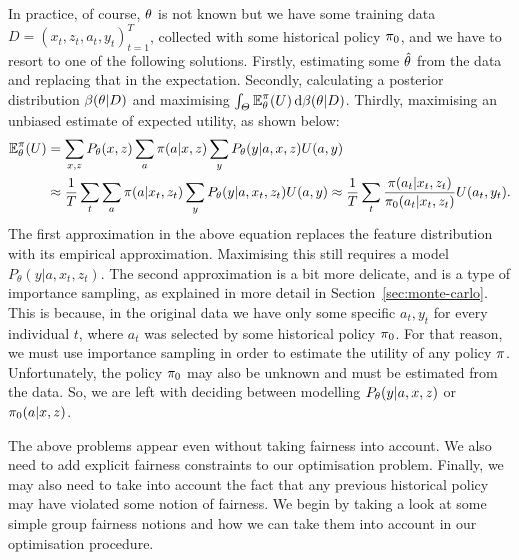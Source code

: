 \begin{frame}
{    
    In practice, of course, $\theta$ is not known but we have some training data $D = (x_t, z_t, a_t, y_t)_{t=1}^T$, collected with some historical policy $\pi_0$, and  we have to resort to one of the following solutions. Firstly, estimating some $\hat{\theta}$ from the data and replacing that in the expectation. Secondly, calculating a posterior distribution $\beta(\theta | D)$ and maximising $\int_\Theta \mathop{\mbox{\ensuremath{\mathbb{E}}}}\nolimits_\theta^\pi(U) \,\mathrm{d} \beta(\theta | D)$. Thirdly, maximising an unbiased estimate of expected utility, as shown below:
    \begin{align*}
      \mathop{\mbox{\ensuremath{\mathbb{E}}}}\nolimits^\pi_\theta(U)
      &=
        \sum_{x,z} P_\theta(x, z) \sum_a \pi(a | x, z) \sum_y P_\theta(y | a, x, z) U(a,y) \\
      &\approx
        \frac{1}{T} \sum_{t} \sum_a \pi(a | x_t, z_t) \sum_y P_\theta(y | a, x_t, z_t) U(a,y)
        \approx
        \frac{1}{T} \sum_{t} \frac{\pi(a_t | x_t, z_t)}{\pi_0(a_t | x_t, z_t)} U(a_t,y_t).
    \end{align*}
    The first approximation in the above equation replaces the feature distribution with its empirical approximation. Maximising this still requires a model $P_\theta(y | a, x_t, z_t)$.
    The second approximation is a bit more delicate, and is a type of importance sampling, as explained in more detail in Section~\ref{sec:monte-carlo}.
    This is because, in the original data we have only some specific $a_t, y_t$ for every individual $t$, where $a_t$ was selected by some historical policy $\pi_0$. For that reason, we must use importance sampling in order to estimate the utility of any policy $\pi$. Unfortunately, the policy $\pi_0$ may also be unknown and must be estimated from the data. So, we are left with deciding between modelling $P_\theta(y | a, x, z)$ or $\pi_0(a | x, z)$.

    The above problems appear even without taking fairness into account. We also need to add explicit fairness constraints to our optimisation problem. Finally, we may also need to take into account the fact that any previous historical policy may have violated some notion of fairness. We begin by taking a look at some simple group fairness notions and how we can take them into account in our optimisation procedure.
  }
\end{frame}  

